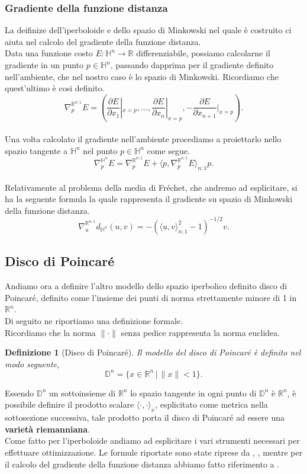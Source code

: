 \documentclass[a4paper, 12pt]{article}
\newtheorem{definition}{Definizione}
\begin{document}
\subsubsection{Gradiente della funzione distanza}
La deifinize dell'iperboloide e dello spazio di Minkowski nel quale è costruito ci aiuta nel calcolo del gradiente della funzione distanza.\\
Data una funzione costo $E:\mathbb{H}^n \to \mathbb{R}$ differenziabile, possiamo calcolarne il gradiente in un punto $p \in \mathbb{H}^n$, passando dapprima per il gradiente definito nell'ambiente, che nel nostro caso è lo spazio di Minkowski. Ricordiamo che quest'ultimo è cosi definito.\\
\[\nabla_{p}^{\mathbb{R}^{n:1}} E = \left (\frac{\partial E}{\partial x_1}|_{x=p}, ..., \frac{\partial E}{\partial x_n}|_{x=p}, -\frac{\partial E}{\partial x_{n+1}}|_{x=p} \right).\]\\
Una volta calcolato il gradiente nell'ambiente procediamo a proiettarlo nello spazio tangente a $\mathbb{H}^n$ nel punto $p \in \mathbb{H}^n$ come segue.\\
\[\nabla_{p}^{\mathbb{H}^n} E = \nabla_{p}^{\mathbb{R}^{n:1}} E + \langle p, \nabla_{p}^{\mathbb{R}^{n:1}} E \rangle_{n:1} p.\]\\
Relativamente al problema della media di Fréchet, che andremo ad esplicitare, si ha la seguente formula la quale rappresenta il gradiente su spazio di Minkowski della funzione distanza.\\
\[\nabla_u^{\mathbb{R}^{n:1}} d_{\mathbb{H}^n}(u,v) = - (\langle u,v \rangle_{n:1}^2 - 1)^{-1/2} v.\]
\subsection{Disco di Poincaré}
Andiamo ora a definire l'altro modello dello spazio iperbolico definito disco di Poincaré, definito come l'insieme dei punti di norma strettamente minore di 1 in $\mathbb{R}^n$.\\
Di seguito ne riportiamo una definizione formale.\\
Ricordiamo che la norma $\| \cdot \|$ senza pedice rappresenta la norma euclidea.\\
\begin{definition}[Disco di Poincaré]
Il modello del disco di Poincaré è definito nel modo seguente,\\
\[ \mathbb{D}^n = \{x \in \mathbb{R}^n \, | \, \| x \| < 1\}.\]
\end{definition}
Essendo $\mathbb{D}^n$ un sottoinsieme di $\mathbb{R}^n$ lo spazio tangente in ogni punto di $\mathbb{D}^n$ è $\mathbb{R}^n$, è possibile definire il prodotto scalare $\langle \cdot, \cdot \rangle_x$, esplicitato come metrica nella sottosezione successiva, tale prodotto porta il disco di Poincaré ad essere una \textbf{varietà riemanniana}.\\
Come fatto per l'iperboloide andiamo ad esplicitare i vari strumenti necessari per effettuare ottimizzazione. Le formule riportate sono state riprese da \cite{GeoOpt}, \cite{Ganea}, mentre per il calcolo del gradiente della funzione distanza abbiamo fatto riferimento a \cite{Nickel}.
\end{document}
